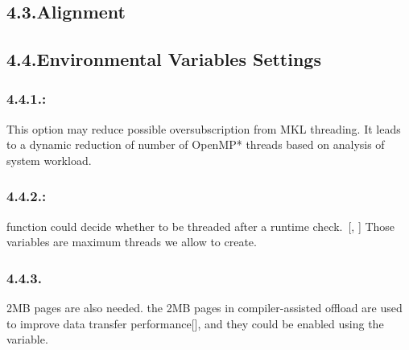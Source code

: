 \documentclass{article}
\begin{document}
\subsection{4.3.\hspace*{0.5em}Alignment}\label{sec-alignment}%

\subsection{4.4.\hspace*{0.5em}Environmental Variables Settings}\label{sec-environmental-variables-settings}%

\subsubsection{4.4.1.\hspace*{0.5em}:}\label{sec-mkl_dynamictrue-}%

\noindent{}This option may reduce possible oversubscription from MKL threading. It leads to a dynamic reduction of number of OpenMP* threads based on analysis of system workload.%

\subsubsection{4.4.2.\hspace*{0.5em}:}\label{sec-mkl_num_threads50-omp_num_threads50-}%

\noindent{} function could decide whether to be threaded after a runtime check.~[, ] Those variables are maximum threads we allow to create.%

\subsubsection{4.4.3.\hspace*{0.5em}}\label{sec-mic_use_2mb_buffers100m}%

\noindent{}2MB pages are also needed. the 2MB pages in compiler-assisted offload are used to improve data transfer performance[], and they could be enabled using the  variable.%
\end{document}
